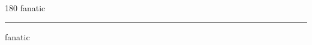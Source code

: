 
\begin{frame}
\begin{center}
\begin{turn}{180}
{\fontsize{2.5cm}{1em}\selectfont fanatic}
\end{turn}
\vspace{1em}\par  
\hrule
\vspace{1em}\par  
{\fontsize{2.5cm}{1em}\selectfont fanatic}
\end{center}
\end{frame}
